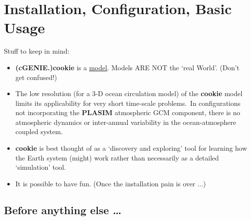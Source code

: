 
\cleardoublepage


\setcounter{chapter}{-1}
\chapter{Installation, Configuration, Basic Usage}\label{ch:0}

\hfill \break

\vspace{16mm}

\noindent Stuff to keep in mind:

\vspace{2mm}

\begin{itemize}
\item \textbf{(cGENIE.)cookie} is a \uline{model}. Models ARE NOT the ‘real World’. (Don’t get confused!)
\item The  low resolution (for a 3-D ocean circulation model) of the \textbf{cookie} model limits its applicability for very short time-scale problems.\ In configurations not incorporating the \textbf{PLASIM} atmospheric GCM component, there is no atmospheric dynamics or inter-annual variability in the ocean-atmosphere coupled system.
\item \textbf{cookie} is best thought of as a ‘discovery and exploring’ tool for learning how the Earth system (might) work rather than necessarily as a detailed ‘simulation’ tool.
\item It is possible to have fun. (Once the installation pain is over ...)
\end{itemize}

\newpage

\section{Before anything else …}


